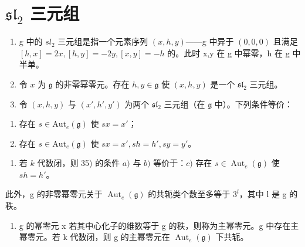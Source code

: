 \section*{\texorpdfstring{\(\mathfrak{sl}_2\) 三元组}{\textbackslash mathfrak\{sl\}\_2 三元组}}

\begin{enumerate}
\def\labelenumi{\arabic{enumi})}
\setcounter{enumi}{32}
\item
  g 中的 \(sl_{2}\) 三元组是指一个元素序列 \((x,h,y)\)——g 中异于 \((0,0,0)\) 且满足 \([h,x]=2x,[h,y]=-2y,[x,y]=-h\) 的。此时 x,y 在 g 中幂零，h 在 g 中半单。
\item
  令 \(x\) 为 \(\mathfrak{g}\) 的非零幂零元。存在 \(h, y \in \mathfrak{g}\) 使 \((x, h, y)\) 是一个 \(\mathfrak{sl}_2\) 三元组。
\item
  令 \((x,h,y)\) 与 \((x',h',y')\) 为两个 \(\mathfrak{sl}_2\) 三元组（在 \(\mathfrak{g}\) 中）。下列条件等价：
\end{enumerate}

\begin{enumerate}
\def\labelenumi{\alph{enumi})}
\item
  存在 \(s \in \text{Aut}_{e}(\mathfrak{g})\) 使 \(sx = x'\)；
\item
  存在 \(s \in \mathrm{Aut}_e(\mathfrak{g})\) 使 \(sx = x', sh = h', sy = y'\)。
\end{enumerate}

\begin{enumerate}
\def\labelenumi{\arabic{enumi})}
\setcounter{enumi}{35}
\tightlist
\item
  若 \(k\) 代数闭，则 35) 的条件 \(a)\) 与 \(b)\) 等价于：\(c)\) 存在 \(s \in \operatorname{Aut}_e(\mathfrak{g})\) 使 \(sh = h'\)。
\end{enumerate}

此外，g 的非零幂零元关于 \(\operatorname{Aut}_{e}(\mathfrak{g})\) 的共轭类个数至多等于 \(3^{l}\)，其中 l 是 g 的秩。

\begin{enumerate}
\def\labelenumi{\arabic{enumi})}
\setcounter{enumi}{36}
\tightlist
\item
  g 的幂零元 x 若其中心化子的维数等于 g 的秩，则称为主幂零元。g 中存在主幂零元。若 k 代数闭，则 g 的主幂零元在 \(\operatorname{Aut}_{e}(\mathfrak{g})\) 下共轭。
\end{enumerate}

